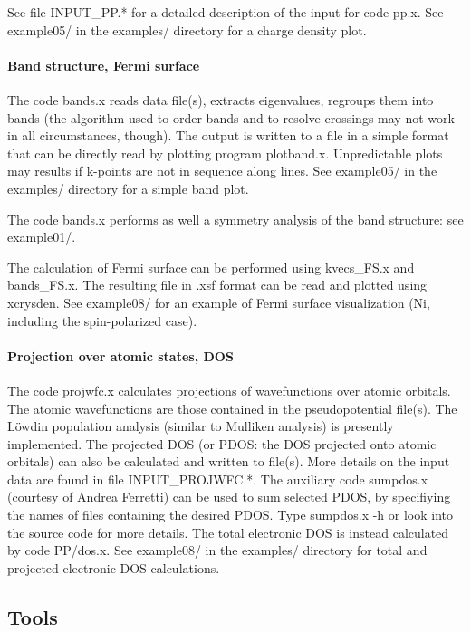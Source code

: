 \documentclass[12pt,a4paper]{article}
\begin{document}
See file INPUT\_PP.* for a detailed description of the input for code pp.x.
See example05/ in the examples/ directory for a charge density plot.

\paragraph{Band structure, Fermi surface}

The code bands.x reads data file(s), extracts eigenvalues,
regroups them into bands (the algorithm used to order bands and to resolve
crossings may not work in all circumstances, though). The output is written
to a file in a simple format that can be directly read by plotting program
plotband.x. Unpredictable plots may results if k-points are not in sequence
along lines. See example05/ in the examples/ directory for a simple band plot.

The code bands.x performs as well a symmetry analysis of the band structure:
see example01/. 

The calculation of Fermi surface can be performed using kvecs\_FS.x and
bands\_FS.x. The resulting file in .xsf format can be read and plotted
using xcrysden. See example08/ for an example of Fermi surface 
visualization (Ni, including the spin-polarized case).

\paragraph{Projection over atomic states, DOS}

The code projwfc.x calculates projections of wavefunctions
over atomic orbitals. The atomic wavefunctions are those contained
in the pseudopotential file(s). The L\"owdin population analysis (similar to
Mulliken analysis) is presently implemented. The projected DOS (or PDOS:
the DOS projected onto atomic orbitals) can also be calculated and written
to file(s). More details on the input data are found in file
INPUT\_PROJWFC.*.  
The auxiliary code sumpdos.x (courtesy of Andrea Ferretti) 
can be used to sum selected PDOS, by specifiying the names of files
containing the desired PDOS. Type sumpdos.x -h or look into the source
code for more details. The total electronic DOS is instead calculated by code
PP/dos.x. See example08/ in the examples/ directory for total and projected 
electronic DOS calculations.

\subsection{Tools}
\end{document}
